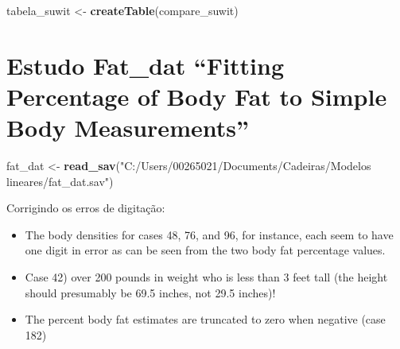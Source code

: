 \documentclass[]{article}
\newenvironment{Shaded}{\begin{snugshade}}{\end{snugshade}}
\newcommand{\KeywordTok}[1]{\textcolor[rgb]{0.13,0.29,0.53}{\textbf{#1}}}
\newcommand{\NormalTok}[1]{#1}
\newcommand{\StringTok}[1]{\textcolor[rgb]{0.31,0.60,0.02}{#1}}
\providecommand{\tightlist}{%
  \setlength{\itemsep}{0pt}\setlength{\parskip}{0pt}}
\begin{document}
\begin{Shaded}
\begin{Highlighting}[]
\NormalTok{tabela_suwit <-}\StringTok{ }\KeywordTok{createTable}\NormalTok{(compare_suwit)}
\end{Highlighting}
\end{Shaded}

\hypertarget{estudo-fat_dat-fitting-percentage-of-body-fat-to-simple-body-measurements}{%
\section{Estudo Fat\_dat ``Fitting Percentage of Body Fat to Simple Body
Measurements''}\label{estudo-fat_dat-fitting-percentage-of-body-fat-to-simple-body-measurements}}

\begin{Shaded}
\begin{Highlighting}[]
\NormalTok{fat_dat <-}\StringTok{ }\KeywordTok{read_sav}\NormalTok{(}\StringTok{"C:/Users/00265021/Documents/Cadeiras/Modelos lineares/fat_dat.sav"}\NormalTok{)}
\end{Highlighting}
\end{Shaded}

Corrigindo os erros de digitação:

\begin{itemize}
\tightlist
\item
  The body densities for cases 48, 76, and 96, for instance, each seem
  to have one digit in error as can be seen from the two body fat
  percentage values.
\item
  Case 42) over 200 pounds in weight who is less than 3 feet tall (the
  height should presumably be 69.5 inches, not 29.5 inches)!
\item
  The percent body fat estimates are truncated to zero when negative
  (case 182)
\end{itemize}
\end{document}
